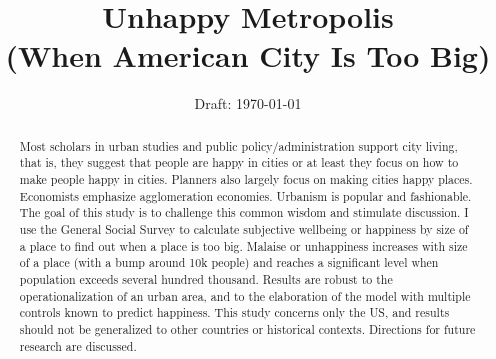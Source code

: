 \documentclass[12pt, letterpaper]{article}
\date{Draft: {}\today}
\title{
Unhappy Metropolis\\ (When American City Is Too Big)
}
\author{
}
\begin{document}


\maketitle
\vspace{-.4in}
\begin{center}

\end{center}


\begin{abstract}
\noindent  
 Most scholars in urban studies and public policy/administration
support city living, that is,  they  suggest
that people are happy in cities or at least they focus on how to make
people happy in cities. Planners also largely focus on making
cities  happy places. Economists emphasize 
agglomeration economies. Urbanism is
 popular and fashionable. %
 The goal of this study is to challenge this common wisdom and
stimulate discussion. 
I use the General Social Survey to calculate subjective
 wellbeing or happiness by size of a place  to find out when a place
 is too big.  
Malaise or unhappiness increases with size of a place (with a bump around 10k
people) and reaches a significant level when population exceeds several hundred thousand. 
 Results are robust to the
operationalization of an urban area, and to the elaboration of the model
with multiple  controls known to predict happiness. 
This study concerns only the US, and results should not be generalized to other countries or historical contexts. Directions for future research are discussed. 
\end{abstract}
\vspace{.15in} 
\end{document}
